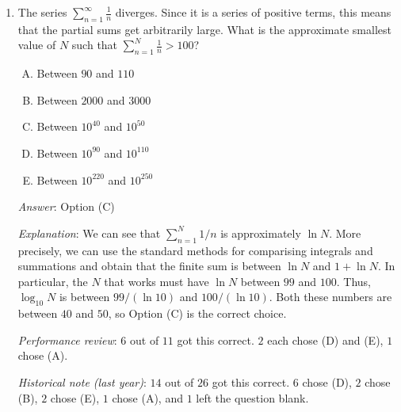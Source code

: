 \documentclass[10pt]{amsart}
\begin{document}
\begin{enumerate}
\item The series $\sum_{n=1}^\infty \frac{1}{n}$ diverges. Since it is
  a series of positive terms, this means that the partial sums get
  arbitrarily large. What is the approximate smallest value of $N$
  such that $\sum_{n=1}^N \frac{1}{n} > 100$?
  \begin{enumerate}[(A)]
  \item Between $90$ and $110$
  \item Between $2000$ and $3000$
  \item Between $10^{40}$ and $10^{50}$
  \item Between $10^{90}$ and $10^{110}$
  \item Between $10^{220}$ and $10^{250}$
  \end{enumerate}

  {\em Answer}: Option (C)

  {\em Explanation}: We can see that $\sum_{n=1}^N 1/n$ is
  approximately $\ln N$. More precisely, we can use the standard
  methods for comparising integrals and summations and obtain that the
  finite sum is between $\ln N$ and $1 + \ln N$. In particular, the
  $N$ that works must have $\ln N$ between $99$ and $100$. Thus,
  $\log_{10}N$ is between $99/(\ln 10)$ and $100/(\ln 10)$. Both these
  numbers are between $40$ and $50$, so Option (C) is the correct
  choice.

  {\em Performance review}: $6$ out of $11$ got this correct. $2$ each
  chose (D) and (E), $1$ chose (A).

  {\em Historical note (last year)}: $14$ out of $26$ got this correct. $6$
  chose (D), $2$ chose (B), $2$ chose (E), $1$ chose (A), and $1$ left
  the question blank.

\end{enumerate}
\end{document}
